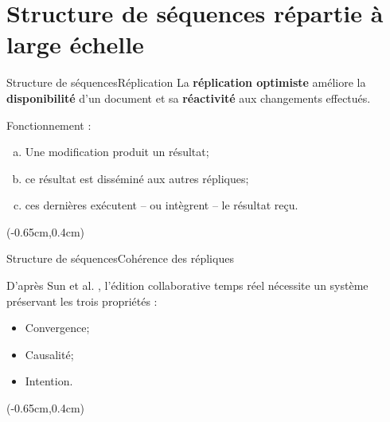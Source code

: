 \section{Structure de séquences répartie à large échelle}

\begin{frame}{Structure de séquences}{Réplication}
  \vspace{-1.5cm}
  La \textbf{réplication optimiste} \REF{} améliore la \textbf{disponibilité} d'un
  document et sa \textbf{réactivité} aux changements effectués.
  \vspace{0.75cm}

  Fonctionnement :
  \begin{enumerate}[(a)]
  \item Une modification produit un résultat;
  \item ce résultat est disséminé aux autres répliques;
  \item ces dernières exécutent -- ou intègrent -- le résultat reçu.
  \end{enumerate}

  \begin{textblock*}{\textwidth}(-0.65cm,0.4cm) 
    
  \end{textblock*}
\end{frame}


\begin{frame}{Structure de séquences}{Cohérence des répliques}
  
  \vspace{-1.5cm}

  D'après Sun et al. \REF{}, l'édition collaborative temps réel nécessite un
  système préservant les trois propriétés : 

  \begin{itemize}
  \item Convergence;
  \item Causalité;
  \item Intention.  
  \end{itemize}

  \begin{textblock*}{\textwidth}(-0.65cm,0.4cm) 
    
  \end{textblock*}

\end{frame}


